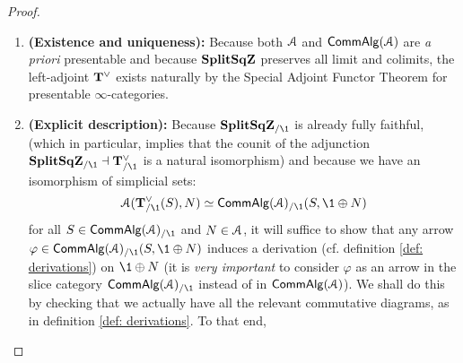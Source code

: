                         \begin{proof}
                            \noindent
                            \begin{enumerate}
                                \item \textbf{(Existence and uniqueness):} Because both $\mathcal{A}$ and $\mathsf{Comm}\mathsf{Alg}(\mathcal{A})$ are \textit{a priori} presentable and because $\mathbf{Split}\mathbf{Sq}\mathbf{Z}$ preserves all limit and colimits, the left-adjoint $\mathbf{T}^{\vee}$ exists naturally by the Special Adjoint Functor Theorem for presentable $\infty$-categories.
                                \item \textbf{(Explicit description):} Because $\Split\SqZ_{/\1}$ is already fully faithful, (which in particular, implies that the counit of the adjunction $\Split\SqZ_{/\1} \ladjoint \bfT^{\vee}_{/\1}$ is a natural isomorphism) and because we have an isomorphism of simplicial sets:
                                    $$\calA(\bfT^{\vee}_{/\1}(S), N) \cong \Comm\Alg(\calA)_{/\1}(S, \1 \oplus N)$$
                                for all $S \in \Comm\Alg(\calA)_{/\1}$ and $N \in \mathcal{A}$, it will suffice to show that any arrow $\varphi \in \Comm\Alg(\calA)_{/\1}(S, \1 \oplus N)$ induces a derivation (cf. definition \ref{def: derivations}) on $\1 \oplus N$ (it is \textit{very important} to consider $\varphi$ as an arrow in the slice category $\Comm\Alg(\calA)_{/\1}$ instead of in $\mathsf{Comm}\mathsf{Alg}(\mathcal{A})$). We shall do this by checking that we actually have all the relevant commutative diagrams, as in definition \ref{def: derivations}. To that end, 
                            \end{enumerate}
                        \end{proof}
